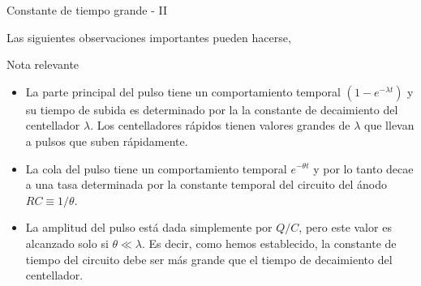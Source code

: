 \documentclass[a4paper,10pt]{beamer}
\begin{document}
\begin{frame}{Constante de tiempo grande - II}
 
 Las siguientes observaciones importantes pueden hacerse,
 
 \begin{block}{Nota relevante}
  \begin{itemize}[<+->]
   \item \begin{justify}
          La parte principal del pulso tiene un comportamiento temporal $(1-e^{-\lambda t})$ 
          y su tiempo de subida es determinado por la la constante de decaimiento del
	  centellador $\lambda$. Los centelladores rápidos tienen valores grandes 
	  de $\lambda$ que llevan a pulsos que suben rápidamente.
         \end{justify}
   \item \begin{justify}
          La cola del pulso tiene un comportamiento temporal $e^{-\theta t}$ y por 
          lo tanto decae a una tasa determinada por la constante temporal del 
          circuito del ánodo $RC \equiv 1/\theta$.
         \end{justify}
     \item \begin{justify}
          La amplitud del pulso está dada simplemente por $Q/C$, pero este valor 
          es alcanzado solo si $\theta \ll \lambda$. Es decir, como hemos establecido, 
          la constante de tiempo del circuito debe ser más grande que el tiempo de 
          decaimiento del centellador.
         \end{justify}      
  \end{itemize}
 \end{block}
\end{frame}
\end{document}
